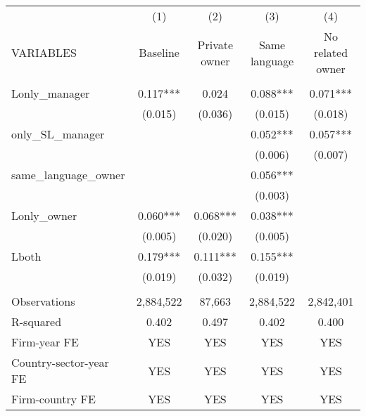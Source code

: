 \begin{tabular}{lcccc} \hline
 & (1) & (2) & (3) & (4) \\
VARIABLES & Baseline & Private owner & Same language & No related owner \\ \hline
 &  &  &  &  \\
Lonly\_manager & 0.117*** & 0.024 & 0.088*** & 0.071*** \\
 & (0.015) & (0.036) & (0.015) & (0.018) \\
only\_SL\_manager &  &  & 0.052*** & 0.057*** \\
 &  &  & (0.006) & (0.007) \\
same\_language\_owner &  &  & 0.056*** &  \\
 &  &  & (0.003) &  \\
Lonly\_owner & 0.060*** & 0.068*** & 0.038*** &  \\
 & (0.005) & (0.020) & (0.005) &  \\
Lboth & 0.179*** & 0.111*** & 0.155*** &  \\
 & (0.019) & (0.032) & (0.019) &  \\
 &  &  &  &  \\
Observations & 2,884,522 & 87,663 & 2,884,522 & 2,842,401 \\
R-squared & 0.402 & 0.497 & 0.402 & 0.400 \\
Firm-year FE & YES & YES & YES & YES \\
Country-sector-year FE & YES & YES & YES & YES \\
 Firm-country FE & YES & YES & YES & YES \\ \hline
\end{tabular}

